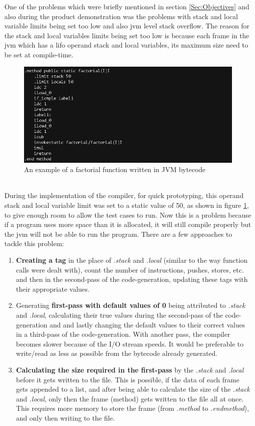 \documentclass[a4paper]{article}
\begin{document}
	One of the problems which were briefly mentioned in section \ref{Sec:Objectives} and also during the product demonstration was the problems with stack and local variable limits being set too low and also \ac{jvm} level stack overflow. The reason for the stack and local variables limits being set too low is because each frame in the \ac{jvm} which has a \ac{lifo} operand stack and local variables, its maximum size need to be set at compile-time. \parencite{JVMSpec}
	\begin{figure}[h]
		\centering
		\includegraphics[width=\linewidth]{images/factorial_bytecode_sample.png}
		\caption{An example of a factorial function written in JVM bytecode}
		\label{fig:factorial_bytecode}
	\end{figure}\\
	During the implementation of the compiler, for quick prototyping, this operand stack and local variable limit was set to a static value of 50, as shown in figure \ref{fig:factorial_bytecode}, to give enough room to allow the test cases to run. Now this is a problem because if a program uses more space than it is allocated, it will still compile properly but the \ac{jvm} will not be able to run the program. There are a few approaches to tackle this problem:
	\begin{enumerate}
		\item \textbf{Creating a tag} in the place of \textit{.stack} and \textit{.local} (similar to the way function calls were dealt with), count the number of instructions, pushes, stores, etc. and then in the second-pass of the code-generation, updating these tags with their appropriate values.
		\item Generating \textbf{first-pass with default values of 0} being attributed to \textit{.stack} and \textit{.local}, calculating their true values during the second-pass of the code-generation and and lastly changing the default values to their correct values in a third-pass of the code-generation. With another pass, the compiler becomes slower because of the I/O stream speeds. It would be preferable to write/read as less as possible from the bytecode already generated.
		\item \textbf{Calculating the size required in the first-pass} by the \textit{.stack} and \textit{.local} before it gets written to the file. This is possible, if the data of each frame gets appended to a list, and after being able to calculate the size of the \textit{.stack} and \textit{.local}, only then the frame (method) gets written to the file all at once. This requires more memory to store the frame (from \textit{.method} to \textit{.endmethod}), and only then writing to the file.
	\end{enumerate}
\end{document}
